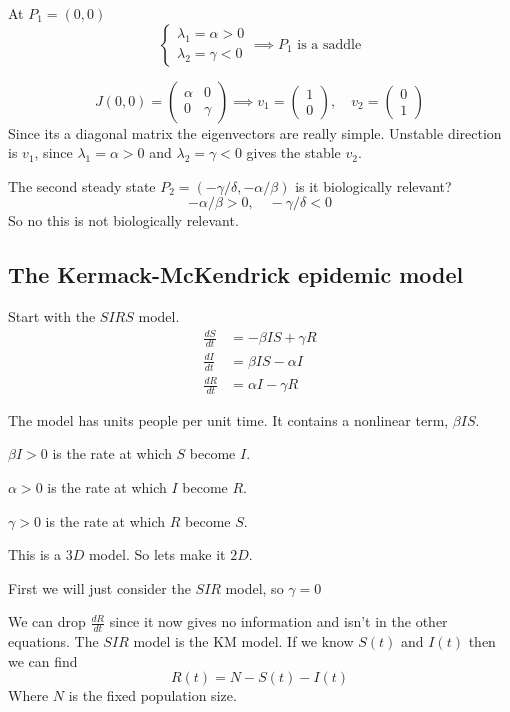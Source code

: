 \documentclass{/home/janmebows/Documents/LatexTemplates/myassignment}
\begin{document}
At $P_1=(0,0)$
\[\begin{cases}
    \lambda_1 = \alpha > 0\\
    \lambda_2 = \gamma <0 
\end{cases}\implies P_1 \text{ is a saddle}\]

\[J(0,0) = \begin{pmatrix}
    \alpha&0\\0&\gamma
\end{pmatrix} \implies v_1 = \begin{pmatrix}
    1\\0
\end{pmatrix}, \quad v_2 =\begin{pmatrix}
    0\\1
\end{pmatrix}\]
Since its a diagonal matrix the eigenvectors are really simple.
Unstable direction is $v_1$, since $\lambda_1 = \alpha > 0$ and $\lambda_2 = \gamma < 0$ gives the stable $v_2$.

The second steady state $P_2 = (-\gamma/\delta, -\alpha/\beta)$ is it biologically relevant? 
\[-\alpha/\beta >0 ,\quad -\gamma/\delta < 0\]
So no this is not biologically relevant.





\subsection{The Kermack-McKendrick epidemic model}
Start with the $SIRS$ model. 
\begin{align*}
    \frac{dS}{dt} &=-\beta IS + \gamma R \\
    \frac{dI}{dt} &=\beta IS - \alpha I \\
    \frac{dR}{dt} &= \alpha I - \gamma R
\end{align*}

The model has units people per unit time. It contains a nonlinear term, $\beta IS$.

$\beta I > 0$ is the rate at which $S$ become $I$.

$\alpha > 0$ is the rate at which $I$ become $R$.

$\gamma > 0$ is the rate at which $R$ become $S$.

This is a $3D$ model. So lets make it $2D$.

First we will just consider the $SIR$ model, so $\gamma = 0$

We can drop $\frac{dR}{dt}$ since it now gives no information and isn't in the other equations. The $SIR$ model is the KM model. If we know $S(t)$ and $I(t)$ then we can find 
\[R(t) = N - S(t) - I(t)\]
Where $N$ is the fixed population size.
\end{document}
